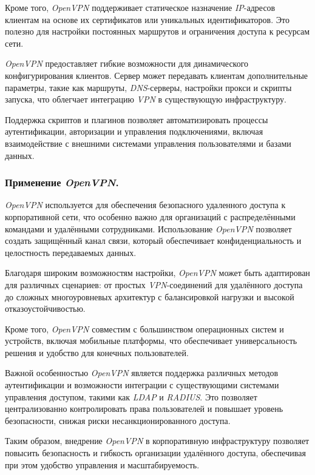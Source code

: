 Кроме того, \textit{OpenVPN} поддерживает статическое назначение \textit{IP}-адресов клиентам на основе их сертификатов или уникальных идентификаторов. Это полезно для настройки постоянных маршрутов и ограничения доступа к ресурсам сети.

\textit{OpenVPN} предоставляет гибкие возможности для динамического конфигурирования клиентов. Сервер может передавать клиентам дополнительные параметры, такие как маршруты, \textit{DNS}-серверы, настройки прокси и скрипты запуска, что облегчает интеграцию \textit{VPN} в существующую инфраструктуру.

Поддержка скриптов и плагинов позволяет автоматизировать процессы аутентификации, авторизации и управления подключениями, включая взаимодействие с внешними системами управления пользователями и базами данных.

\subsubsection{Применение \textit{OpenVPN}.}
\textit{OpenVPN} используется для обеспечения безопасного удаленного доступа к корпоративной сети, что особенно важно для организаций с распределёнными командами и удалёнными сотрудниками. Использование \textit{OpenVPN} позволяет создать защищённый канал связи, который обеспечивает конфиденциальность и целостность передаваемых данных.

Благодаря широким возможностям настройки, \textit{OpenVPN} может быть адаптирован для различных сценариев: от простых \textit{VPN}-соединений для удалённого доступа до сложных многоуровневых архитектур с балансировкой нагрузки и высокой отказоустойчивостью.

Кроме того, \textit{OpenVPN} совместим с большинством операционных систем и устройств, включая мобильные платформы, что обеспечивает универсальность решения и удобство для конечных пользователей.

Важной особенностью \textit{OpenVPN} является поддержка различных методов аутентификации и возможности интеграции с существующими системами управления доступом, такими как \textit{LDAP} и \textit{RADIUS}. Это позволяет централизованно контролировать права пользователей и повышает уровень безопасности, снижая риски несанкционированного доступа.

Таким образом, внедрение \textit{OpenVPN} в корпоративную инфраструктуру позволяет повысить безопасность и гибкость организации удалённого доступа, обеспечивая при этом удобство управления и масштабируемость.

